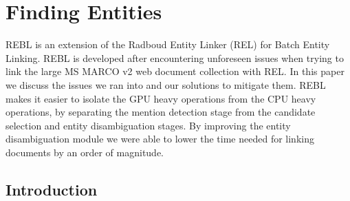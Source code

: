 \chapter{Finding Entities}
\label{a-graph-of-entities}

\begin{Abstract}
	\begin{changemargin}{1cm}{1cm}
		REBL is an extension of the Radboud Entity Linker (REL) for Batch Entity Linking. 
		REBL is developed after encountering unforeseen issues when trying to link the large MS MARCO v2 web document collection with REL. In this paper we discuss the issues we ran into and our solutions to mitigate them. REBL makes it easier to isolate the GPU heavy operations from the CPU heavy operations, by separating the mention detection stage from the candidate selection and entity disambiguation stages. By improving the entity disambiguation module we were able to lower the time needed for linking documents by an order of magnitude.
	\end{changemargin}
\end{Abstract}


\section{Introduction}

